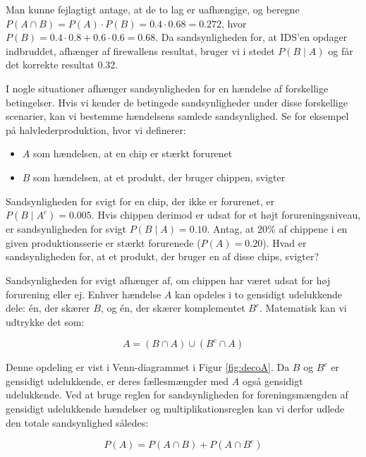 \begin{remark}
    Man kunne fejlagtigt antage, at de to lag er uafhængige, og beregne $P(A \cap B)=P(A) \cdot P(B)=0.4 \cdot 0.68=0.272$, hvor $P(B)=0.4 \cdot 0.8+0.6 \cdot 0.6=0.68$. Da sandsynligheden for, at IDS'en opdager indbruddet, afhænger af firewallens resultat, bruger vi i stedet $P(B \mid A)$ og får det korrekte resultat 0.32.
\end{remark}

I nogle situationer afhænger sandsynligheden for en hændelse af forskellige betingelser. Hvis vi kender de betingede sandsynligheder under disse forskellige scenarier, kan vi bestemme hændelsens samlede sandsynlighed. Se for eksempel på halvlederproduktion, hvor vi definerer:
\begin{itemize}
    \item \( A \) som hændelsen, at en chip er stærkt forurenet
    \item \( B \) som hændelsen, at et produkt, der bruger chippen, svigter
\end{itemize}
Sandsynligheden for svigt for en chip, der ikke er forurenet, er \( P(B \mid A^c) = 0.005 \). Hvis chippen derimod er udsat for et højt forureningsniveau, er sandsynligheden for svigt \( P(B \mid A) = 0.10 \). Antag, at \( 20\% \) af chippene i en given produktionsserie er stærkt forurenede (\( P(A) = 0.20 \)). Hvad er sandsynligheden for, at et produkt, der bruger en af disse chips, svigter?

Sandsynligheden for svigt afhænger af, om chippen har været udsat for høj forurening eller ej. Enhver hændelse \( A \) kan opdeles i to gensidigt udelukkende dele: én, der skærer \( B \), og én, der skærer komplementet \( B^c \). Matematisk kan vi udtrykke det som:

\[
A = (B \cap A) \cup (B^c \cap A)
\]

Denne opdeling er vist i Venn-diagrammet i Figur \ref{fig:decoA}. Da \( B \) og \( B^c \) er gensidigt udelukkende, er deres fællesmængder med \( A \) også gensidigt udelukkende. Ved at bruge reglen for sandsynligheden for foreningsmængden af gensidigt udelukkende hændelser og multiplikationsreglen kan vi derfor udlede den totale sandsynlighed således:

\[
P(A) = P(A \cap B) + P(A \cap B^c)
\]

\def\firstellipse{(3,1) ellipse (4.5cm and 2.2cm)} %


